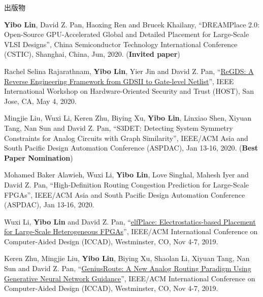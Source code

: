\begin{rSection}{出版物}
\begin{description}[font=\normalfont, rightmargin=2em]
\item[{[C37]}]{
        \textbf{Yibo Lin}, David Z. Pan, Haoxing Ren and Brucek Khailany, 
    ``DREAMPlace 2.0: Open-Source GPU-Accelerated Global and Detailed Placement for Large-Scale VLSI Designs'', 
    China Semiconductor Technology International Conference (CSTIC), Shanghai, China, Jun, 2020.
    (\textbf{Invited paper})
}
            

\item[{[C36]}]{
        Rachel Selina Rajarathnam, \textbf{Yibo Lin}, Yier Jin and David Z. Pan, 
    ``\href{https://doi.org/10.1109/HOST45689.2020.9300272}{ReGDS: A Reverse Engineering Framework from GDSII to Gate-level Netlist}'', 
    IEEE International Workshop on Hardware-Oriented Security and Trust (HOST), San Jose, CA, May 4, 2020.
    
}
            

\item[{[C35]}]{
        Mingjie Liu, Wuxi Li, Keren Zhu, Biying Xu, \textbf{Yibo Lin}, Linxiao Shen, Xiyuan Tang, Nan Sun and David Z. Pan, 
    ``S3DET: Detecting System Symmetry Constraints for Analog Circuits with Graph Similarity'', 
    IEEE/ACM Asia and South Pacific Design Automation Conference (ASPDAC), Jan 13-16, 2020.
    (\textbf{Best Paper Nomination})
}
            

\item[{[C34]}]{
        Mohamed Baker Alawieh, Wuxi Li, \textbf{Yibo Lin}, Love Singhal, Mahesh Iyer and David Z. Pan, 
    ``High-Definition Routing Congestion Prediction for Large-Scale FPGAs'', 
    IEEE/ACM Asia and South Pacific Design Automation Conference (ASPDAC), Jan 13-16, 2020.
    
}
            

\item[{[C33]}]{
        Wuxi Li, \textbf{Yibo Lin} and David Z. Pan, 
    ``\href{https://doi.org/10.1109/ICCAD45719.2019.8942075}{elfPlace: Electrostatics-based Placement for Large-Scale Heterogeneous FPGAs}'', 
    IEEE/ACM International Conference on Computer-Aided Design (ICCAD), Westminster, CO, Nov 4-7, 2019.
    
}
            

\item[{[C32]}]{
        Keren Zhu, Mingjie Liu, \textbf{Yibo Lin}, Biying Xu, Shaolan Li, Xiyuan Tang, Nan Sun and David Z. Pan, 
    ``\href{https://doi.org/10.1109/ICCAD45719.2019.8942164}{GeniusRoute: A New Analog Routing Paradigm Using Generative Neural Network Guidance}'', 
    IEEE/ACM International Conference on Computer-Aided Design (ICCAD), Westminster, CO, Nov 4-7, 2019.
    
}
\end{description}
\end{rSection}
